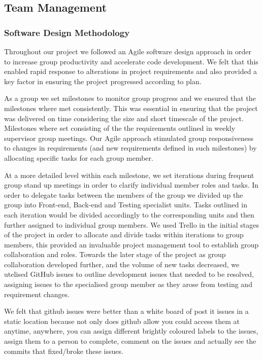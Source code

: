 \subsection{Team Management}
  \subsubsection{Software Design Methodology}
    Throughout our project we followed an Agile software design approach in order to increase group productivity and accelerate code development. We felt that this enabled rapid response to alterations in project requirements and also provided a key factor in ensuring the project progressed according to plan.

    As a group we set milestones to monitor group progress and we ensured that the milestones where met consistently. This was essential in ensuring that the project was delivered on time considering the size and short timescale of the project. Milestones where set consisting of the the requirements outlined in weekly supervisor group meetings. Our Agile approach stimulated group responsiveness to changes in requirements (and new requirements defined in such milestones) by allocating specific tasks for each group member. 

    At a more detailed level within each milestone, we set iterations during frequent group stand up meetings in order to clarify individual member roles and tasks. In order to delegate tasks between the members of the group we divided up the group into Front-end, Back-end and Testing specialist units. Tasks outlined in each iteration would be divided accordingly to the corresponding units and then further assigned to individual group members. We used Trello in the initial stages of the project in order to allocate and divide tasks within iterations to group members, this provided an invaluable project management tool to establish group collaboration and roles. Towards the later stage of the project as group collaboration developed further, and the volume of new tasks decreased, we utelised GitHub\cite{github} issues to outline development issues that needed to be resolved, assigning issues to the specialised group member as they arose from testing and requirement changes.

    We felt that github issues were better than a white board of post it issues in a static location because not only does github allow you could access them at anytime, anywhere, you can assign different brightly coloured labels to the issues, assign them to a person to complete, comment on the issues and actually see the commits that fixed/broke these issues. 

